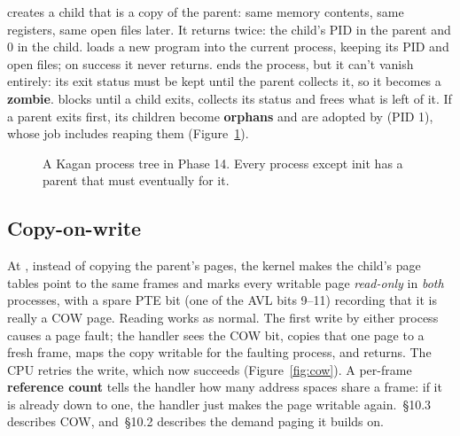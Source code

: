 \documentclass[11pt,a4paper]{article}
\begin{document}
\textbf{} creates a child that is a copy of the parent: same memory contents, same registers, same open
files later. It returns twice: the child's PID in the parent and 0 in the child. \textbf{} loads a new program into the current process, keeping its PID and open files; on success it never returns.
\textbf{} ends the process, but it can't vanish entirely: its exit status must be kept until the
parent collects it, so it becomes a \textbf{zombie}. \textbf{} blocks until a
child exits, collects its status and frees what is left of it. If a parent exits first, its children become
\textbf{orphans} and are adopted by  (PID 1), whose job includes reaping them (Figure~\ref{fig:tree}).

\begin{figure}[htbp]
\centering
{}
\caption{A Kagan process tree in Phase 14. Every process except init has a parent that must eventually  for it.}
\label{fig:tree}
\end{figure}

\subsection{Copy-on-write}

At , instead of copying the parent's pages, the kernel makes the child's page tables point to the same
frames and marks every writable page \emph{read-only} in \emph{both} processes, with a spare PTE bit (one of the AVL
bits 9--11) recording that it is really a COW page. Reading works as normal. The first write by either process causes
a page fault; the handler sees the COW bit, copies that one page to a fresh frame, maps the copy writable for the
faulting process, and returns. The CPU retries the write, which now succeeds (Figure~\ref{fig:cow}). A per-frame
\textbf{reference count} tells the handler how many address spaces share a frame: if it is already down to one, the
handler just makes the page writable again. \OSC\,\S10.3 describes COW, and \OSC\,\S10.2 describes the demand paging
it builds on.
\end{document}
